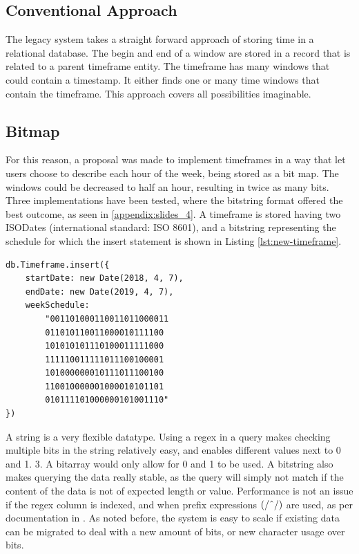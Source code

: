 \subsection{Conventional Approach}
The legacy system takes a straight forward approach of storing time in a relational database. The begin and end of a window are stored in a record that is related to a parent timeframe entity. The timeframe has many windows that could contain a timestamp. It either finds one or many time windows that contain the timeframe. This approach covers all possibilities imaginable.

\subsection{Bitmap}
For this reason, a proposal was made to implement timeframes in a way that let users choose to describe each hour of the week, being stored as a bit map. The windows could be decreased to half an hour, resulting in twice as many bits. Three implementations have been tested, where the bitstring format offered the best outcome, as seen in \ref{appendix:slides_4}. A timeframe is stored having two ISODates (international standard: ISO 8601), and a bitstring representing the schedule for which the insert statement is shown in Listing \ref{lst:new-timeframe}.

\begin{center}
	\noindent\begin{minipage}{.45\textwidth}
		\begin{lstlisting}[caption={Improved timeframe.}, label={lst:new-timeframe}]
db.Timeframe.insert({
	startDate: new Date(2018, 4, 7),
	endDate: new Date(2019, 4, 7),
	weekSchedule:
		"001101000110011011000011
		011010110011000010111100
		101010101110100011111000
		111110011111011100100001
		101000000010111011100100
		110010000001000010101101
		010111101000000101001110"
})
\end{lstlisting}
	\end{minipage}
\end{center}

A string is a very flexible datatype. Using a regex in a query makes checking multiple bits in the string relatively easy, and enables different values next to 0 and 1. 3. A bitarray would only allow for 0 and 1 to be used. A bitstring also makes querying the data really stable, as the query will simply not match if the content of the data is not of expected length or value. Performance is not an issue if the regex column is indexed, and when prefix expressions $(/\string^/)$ are used, as per documentation in \cite{MongoDB-Regex}. As noted before, the system is easy to scale if existing data can be migrated to deal with a new amount of bits, or new character usage over bits.

